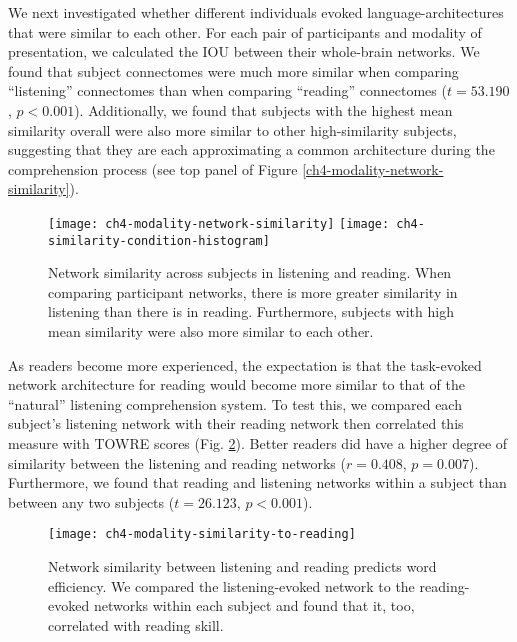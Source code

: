 We next investigated whether different individuals evoked language-architectures that were similar to each other. For each pair of participants and modality of presentation, we calculated the IOU between their whole-brain networks. We found that subject connectomes were much more similar when comparing ``listening'' connectomes than when comparing ``reading'' connectomes ($t = 53.190$, $p < 0.001$). Additionally, we found that subjects with the highest mean similarity overall were also more similar to other high-similarity subjects, suggesting that they are each approximating a common architecture during the comprehension process (see top panel of Figure \ref{ch4-modality-network-similarity}).

\begin{figure}[t]
	\centering
	\texttt{[image: ch4-modality-network-similarity]}
	\texttt{[image: ch4-similarity-condition-histogram]}
    \caption[Network similarity across subjects in listening and reading.] {Network similarity across subjects in listening and reading. When comparing participant networks, there is more greater similarity in listening than there is in reading. Furthermore, subjects with high mean similarity were also more similar to each other.}
	\label{fig:ch4-modality-network-similarity}
\end{figure}

As readers become more experienced, the expectation is that the task-evoked network architecture for reading would become more similar to that of the ``natural'' listening comprehension system. To test this, we compared each subject's listening network with their reading network then correlated this measure with TOWRE scores (Fig. \ref{fig:ch4-modality-similarity-to-reading}). Better readers did have a higher degree of similarity between the listening and reading networks ($r = 0.408$, $p = 0.007$). Furthermore, we found that reading and listening networks within a subject than between any two subjects ($t = 26.123$, $p < 0.001$). 

\begin{figure}[t]
	\centering
	\texttt{[image: ch4-modality-similarity-to-reading]}
    \caption[Network similarity between listening and reading predicts word efficiency.]{Network similarity between listening and reading predicts word efficiency. We compared the listening-evoked network to the reading-evoked networks within each subject and found that it, too, correlated with reading skill.}
	\label{fig:ch4-modality-similarity-to-reading}
\end{figure}

